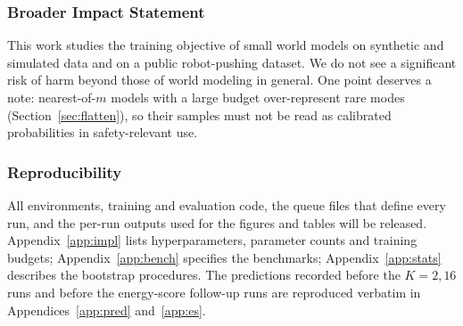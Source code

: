 \documentclass[10pt]{article} %
\newcommand{\nom}{nearest-of-$m$}
\begin{document}











\subsubsection*{Broader Impact Statement}
This work studies the training objective of small world models on synthetic and simulated data and on a public robot-pushing dataset. We do not see a significant risk of harm beyond those of world modeling in general. One point deserves a note: \nom{} models with a large budget over-represent rare modes (Section~\ref{sec:flatten}), so their samples must not be read as calibrated probabilities in safety-relevant use.

\subsubsection*{Reproducibility}
All environments, training and evaluation code, the queue files that define every run, and the per-run outputs used for the figures and tables will be released. Appendix~\ref{app:impl} lists hyperparameters, parameter counts and training budgets; Appendix~\ref{app:bench} specifies the benchmarks; Appendix~\ref{app:stats} describes the bootstrap procedures. The predictions recorded before the $K{=}2,16$ runs and before the energy-score follow-up runs are reproduced verbatim in Appendices~\ref{app:pred} and~\ref{app:es}.




\appendix

\end{document}
